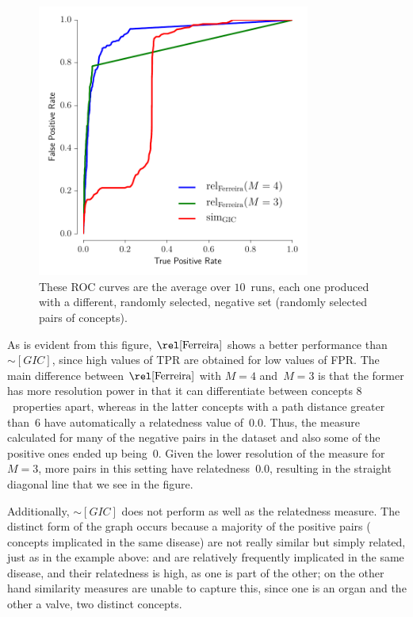 \begin{figure}
    \centering
    \includegraphics[width=0.8\textwidth]{images/roc.pdf}
    \caption[ROC analysis of the results of~$\ferreira$]{These ROC curves are the average over $10$~runs, each one produced with a different, randomly selected, negative set (\ie randomly selected pairs of  concepts).}
    \label{fig:roc}
\end{figure}

As is evident from this figure, $\ferreira$ shows a better performance than $\sim[GIC]$, since high values of TPR are obtained for low values of FPR. The main difference between $\ferreira$ with $M=4$ and~$M=3$ is that the former has more resolution power in that it can differentiate between concepts $8$~properties apart, whereas in the latter concepts with a path distance greater than~$6$ have automatically a relatedness value of~$0.0$. Thus, the measure calculated for many of the negative pairs in the dataset and also some of the positive ones ended up being~$0$. Given the lower resolution of the measure for~$M=3$, more pairs in this setting have relatedness~$0.0$, resulting in the straight diagonal line that we see in the figure.

Additionally, $\sim[GIC]$ does not perform as well as the relatedness measure. The distinct form of the graph occurs because a majority of the positive pairs ( concepts implicated in the same disease) are not really similar but simply related, just as in the example above:  and  are relatively frequently implicated in the same disease, and their relatedness is high, as one is part of the other; on the other hand similarity measures are unable to capture this, since one is an organ and the other a valve, two distinct concepts.

